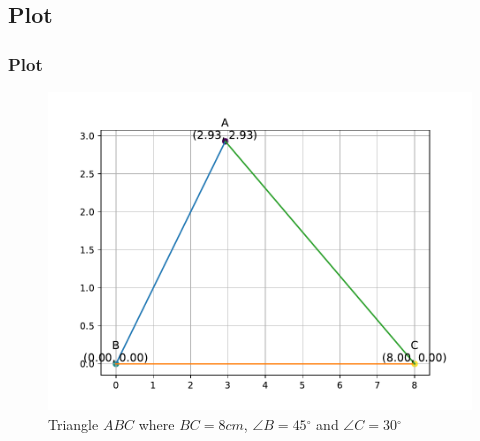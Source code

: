 \documentclass{beamer}
\theoremstyle{remark}
\providecommand{\degree}{{^\circ}}
\numberwithin{equation}{section}
\begin{document}
\subsection{Plot}
\begin{frame}    
\frametitle{Plot}
\begin{figure}[h!]
    \centering
    \includegraphics[width=0.7\linewidth]{figs/fig.pdf}
    \caption{Triangle $ABC$ where $BC=8cm$, $\angle B = 45 \degree$ and $\angle C = 30 \degree$}
\end{figure}

\end{frame}
\end{document}
